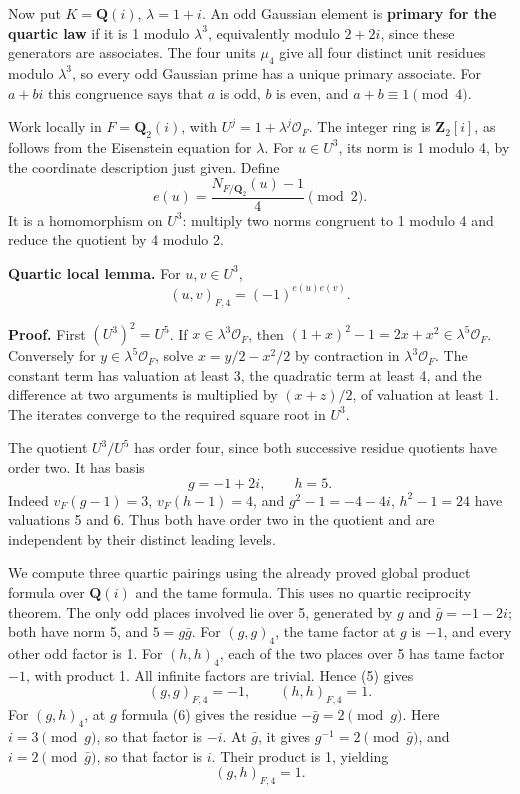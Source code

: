 \documentclass[11pt,a4paper]{article}
\begin{document}
Now put \(K=\mathbf Q(i)\), \(\lambda=1+i\). An odd Gaussian element is
\textbf{primary for the quartic law} if it is 1 modulo \(\lambda^3\),
equivalently modulo \(2+2i\), since these generators are associates. The
four units \(\mu_4\) give all four distinct unit residues modulo
\(\lambda^3\), so every odd Gaussian prime has a unique primary
associate. For \(a+bi\) this congruence says that \(a\) is odd, \(b\) is
even, and \(a+b\equiv1\pmod4\).

Work locally in \(F=\mathbf Q_2(i)\), with
\(U^j=1+\lambda^j\mathcal O_F\). The integer ring is \(\mathbf Z_2[i]\),
as follows from the Eisenstein equation for \(\lambda\). For
\(u\in U^3\), its norm is 1 modulo 4, by the coordinate description just
given. Define \[
e(u)=\frac{N_{F/\mathbf Q_2}(u)-1}{4}\pmod2.
\tag{13}
\] It is a homomorphism on \(U^3\): multiply two norms congruent to 1
modulo 4 and reduce the quotient by 4 modulo 2.

\textbf{Quartic local lemma.} For \(u,v\in U^3\), \[
(u,v)_{F,4}=(-1)^{e(u)e(v)}.
\tag{14}
\]

\textbf{Proof.} First \((U^3)^2=U^5\). If \(x\in\lambda^3\mathcal O_F\),
then \((1+x)^2-1=2x+x^2\in\lambda^5\mathcal O_F\). Conversely for
\(y\in\lambda^5\mathcal O_F\), solve \(x=y/2-x^2/2\) by contraction in
\(\lambda^3\mathcal O_F\). The constant term has valuation at least 3,
the quadratic term at least 4, and the difference at two arguments is
multiplied by \((x+z)/2\), of valuation at least 1. The iterates
converge to the required square root in \(U^3\).

The quotient \(U^3/U^5\) has order four, since both successive residue
quotients have order two. It has basis \[
g=-1+2i,\qquad h=5.
\tag{15}
\] Indeed \(v_F(g-1)=3\), \(v_F(h-1)=4\), and \(g^2-1=-4-4i\),
\(h^2-1=24\) have valuations 5 and 6. Thus both have order two in the
quotient and are independent by their distinct leading levels.

We compute three quartic pairings using the already proved global
product formula over \(\mathbf Q(i)\) and the tame formula. This uses no
quartic reciprocity theorem. The only odd places involved lie over 5,
generated by \(g\) and \(\bar g=-1-2i\); both have norm 5, and
\(5=g\bar g\). For \((g,g)_4\), the tame factor at \(g\) is \(-1\), and
every other odd factor is 1. For \((h,h)_4\), each of the two places
over 5 has tame factor \(-1\), with product 1. All infinite factors are
trivial. Hence (5) gives \[
(g,g)_{F,4}=-1,\qquad(h,h)_{F,4}=1.
\tag{16}
\] For \((g,h)_4\), at \(g\) formula (6) gives the residue
\(-\bar g=2\pmod g\). Here \(i=3\pmod g\), so that factor is \(-i\). At
\(\bar g\), it gives \(g^{-1}=2\pmod{\bar g}\), and
\(i=2\pmod{\bar g}\), so that factor is \(i\). Their product is 1,
yielding \[
(g,h)_{F,4}=1.
\tag{17}
\]
\end{document}
